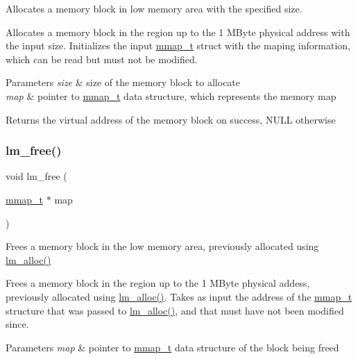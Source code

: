Allocates a memory block in low memory area with the specified size. 

Allocates a memory block in the region up to the 1 M\+Byte physical address with the input size. Initializes the input \hyperlink{structmmap__t}{mmap\+\_\+t} struct with the maping information, which can be read but must not be modified.


\begin{DoxyParams}{Parameters}
{\em size} & size of the memory block to allocate \\
\hline
{\em map} & pointer to \hyperlink{structmmap__t}{mmap\+\_\+t} data structure, which represents the memory map \\
\hline
\end{DoxyParams}
\begin{DoxyReturn}{Returns}
the virtual address of the memory block on success, N\+U\+LL otherwise 
\end{DoxyReturn}
\hypertarget{group__lmlib_ga73e89d9c297b7390021fb545513579c6}{}\label{group__lmlib_ga73e89d9c297b7390021fb545513579c6} 
\subsubsection{\texorpdfstring{lm\+\_\+free()}{lm\_free()}}
{\footnotesize\ttfamily void lm\+\_\+free (\begin{DoxyParamCaption}\item[{\hyperlink{structmmap__t}{mmap\+\_\+t} $\ast$}]{map }\end{DoxyParamCaption})}



Frees a memory block in the low memory area, previously allocated using \hyperlink{group__lmlib_gae45d971ce2ffcf4dc2677eba033a92cd}{lm\+\_\+alloc()} 

Frees a memory block in the region up to the 1 M\+Byte physical addess, previously allocated using \hyperlink{group__lmlib_gae45d971ce2ffcf4dc2677eba033a92cd}{lm\+\_\+alloc()}. Takes as input the address of the \hyperlink{structmmap__t}{mmap\+\_\+t} structure that was passed to \hyperlink{group__lmlib_gae45d971ce2ffcf4dc2677eba033a92cd}{lm\+\_\+alloc()}, and that must have not been modified since.


\begin{DoxyParams}{Parameters}
{\em map} & pointer to \hyperlink{structmmap__t}{mmap\+\_\+t} data structure of the block being freed \\
\hline
\end{DoxyParams}
\hypertarget{group__lmlib_ga00a9c17c01e794a6bfc80fc5c6ab1ed1}{}\label{group__lmlib_ga00a9c17c01e794a6bfc80fc5c6ab1ed1} 
